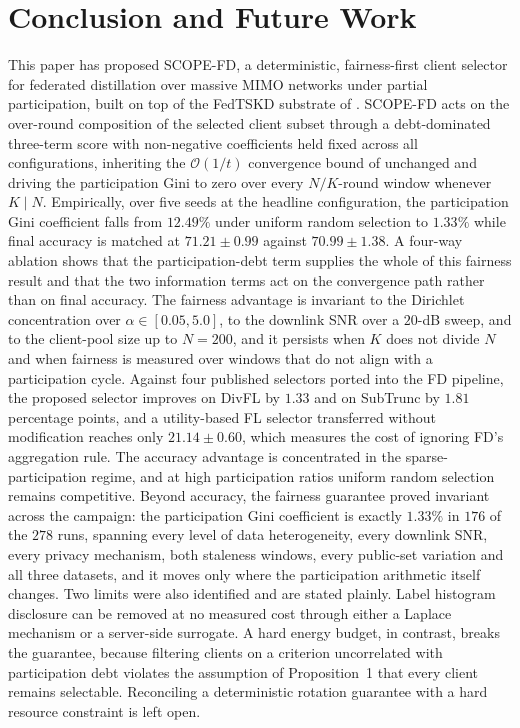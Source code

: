\documentclass[journal]{IEEEtran}
\newcommand{\revIVE}[1]{#1}
\newcommand{\rev}[1]{#1}
\begin{document}
\section{Conclusion and Future Work}
\label{sec:conclusion}
This paper has proposed SCOPE-FD, a deterministic, fairness-first client selector for federated distillation over massive MIMO networks under partial participation, built on top of the FedTSKD substrate of \cite{mu2024fedtskd}. SCOPE-FD acts on the over-round composition of the selected client subset through a debt-dominated three-term score with non-negative coefficients held fixed across all configurations, inheriting the $\mathcal{O}(1/t)$ convergence bound of \cite{mu2024fedtskd} unchanged and \revIVE{driving the participation Gini to zero over every $N/K$-round window whenever $K \mid N$}. \rev{Empirically, over five seeds at the headline configuration, the participation Gini coefficient falls from $12.49\%$ under uniform random selection to $1.33\%$ while final accuracy is matched at $71.21 \pm 0.99$ against $70.99 \pm 1.38$. A four-way ablation shows that the participation-debt term supplies the whole of this fairness result and that the two information terms act on the convergence path rather than on final accuracy. The fairness advantage is invariant to the Dirichlet concentration over $\alpha \in [0.05, 5.0]$, to the downlink SNR over a $20$-dB sweep, and to the client-pool size up to $N = 200$, and it persists when $K$ does not divide $N$ and when fairness is measured over windows that do not align with a participation cycle. Against four published selectors ported into the FD pipeline, the proposed selector improves on DivFL by $1.33$ and on SubTrunc by $1.81$ percentage points, and a utility-based FL selector transferred without modification reaches only $21.14 \pm 0.60$, which measures the cost of ignoring FD's aggregation rule. The accuracy advantage is concentrated in the sparse-participation regime, and at high participation ratios uniform random selection remains competitive. Beyond accuracy, the fairness guarantee proved invariant across the campaign: the participation Gini coefficient is exactly $1.33\%$ in $176$ of the $278$ runs, spanning every level of data heterogeneity, every downlink SNR, every privacy mechanism, both staleness windows, every public-set variation and all three datasets, and it moves only where the participation arithmetic itself changes. Two limits were also identified and are stated plainly. Label histogram disclosure can be removed at no measured cost through either a Laplace mechanism or a server-side surrogate. A hard energy budget, in contrast, breaks the guarantee, because filtering clients on a criterion uncorrelated with participation debt violates the assumption of Proposition~1 that every client remains selectable. Reconciling a deterministic rotation guarantee with a hard resource constraint is left open.}
\end{document}

